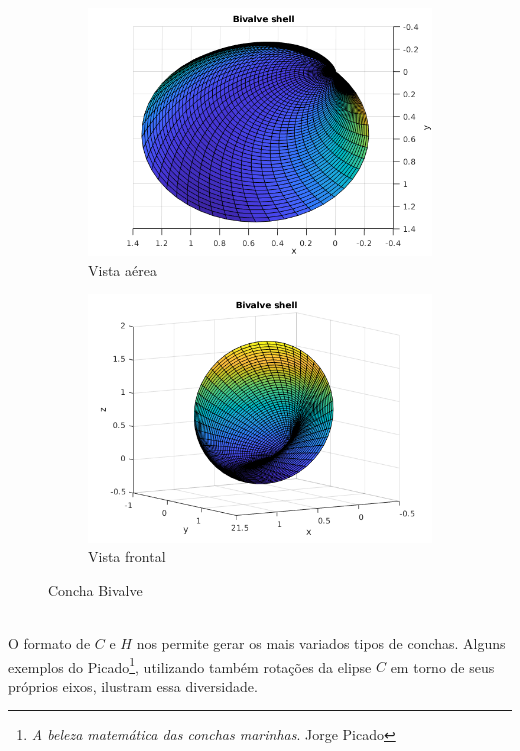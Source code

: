 \documentclass[a4paper]{article}
\begin{document}
\begin{figure}[h!]
\centering
\begin{subfigure}{.5\textwidth}
  \centering
  \includegraphics[width=.9\textwidth]{bivalve_up.png}
  \caption{Vista aérea}
  \label{planorbis_up}
\end{subfigure}%
\begin{subfigure}{.5\textwidth}
  \centering
  \includegraphics[width=.9\textwidth]{bivalve_front.png}
  \caption{Vista frontal}
  \label{fig:sub2}
\end{subfigure}
\caption{Concha Bivalve}
\label{planorbis_front}
\end{figure}


\hfill \\
O formato de $C$ e $H$ nos permite gerar os mais variados tipos de conchas. Alguns exemplos do Picado\footnote{\textit{A beleza matemática das conchas marinhas}. Jorge Picado}, utilizando também rotações da elipse $C$ em torno de seus próprios eixos, ilustram essa diversidade.
\end{document}
